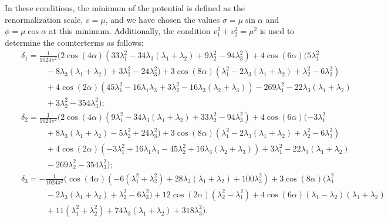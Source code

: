 \documentclass[11pt,a4paper,english,superscriptaddress,preprint,aps,prd]{revtex4}
\begin{document}
\noindent In these conditions, the minimum of the potential is defined as the renormalization scale, $v=\mu$, and we have chosen the values $\sigma=\mu\sin\alpha$ and $\phi=\mu\cos\alpha$ at this minimum. Additionally, the condition $v_1^2+v_2^2=\mu^2$ is used to determine the counterterms as follows:
\begin{subequations}\label{1loop-ct}
\begin{eqnarray}
 &&\delta_1 = \frac{1}{1024 \pi ^2}\Bigr(2 \cos (4 \alpha ) \left(33 \lambda_1^2-34 \lambda_3 (\lambda_1+\lambda_2)+9 \lambda_2^2-94 \lambda_3^2\right)+4 \cos (6 \alpha ) (5 \lambda_1^2\nonumber\\
 &&\qquad\quad-8 \lambda_3 (\lambda_1+\lambda_2)+3 \lambda_2^2-24 \lambda_3^2)+3 \cos (8 \alpha ) \left(\lambda_1^2-2 \lambda_3 (\lambda_1+\lambda_2)+\lambda_2^2-6 \lambda_3^2\right)\nonumber\\
 &&\qquad\quad+4 \cos (2 \alpha ) \left(45 \lambda_1^2-16 \lambda_1 \lambda_3+3 \lambda_2^2-16 \lambda_3 (\lambda_2+\lambda_3)\right)-269 \lambda_1^2-22 \lambda_3 (\lambda_1+\lambda_2)\nonumber\\
 &&\qquad\quad+3 \lambda_2^2-354 \lambda_3^2\Bigr);\\
 &&\delta_2 = \frac{1}{1024 \pi ^2}\Bigr(2 \cos (4 \alpha ) \left(9 \lambda_1^2-34 \lambda_3 (\lambda_1+\lambda_2)+33 \lambda_2^2-94 \lambda_3^2\right)+4 \cos (6 \alpha ) (-3 \lambda_1^2\nonumber\\
 &&\qquad\quad+8 \lambda_3 (\lambda_1+\lambda_2)-5 \lambda_2^2+24 \lambda_3^2)+3 \cos (8 \alpha ) \left(\lambda_1^2-2 \lambda_3 (\lambda_1+\lambda_2)+\lambda_2^2-6 \lambda_3^2\right)\nonumber\\
 &&\qquad\quad+4 \cos (2 \alpha ) \left(-3 \lambda_1^2+16 \lambda_1 \lambda_3-45 \lambda_2^2+16 \lambda_3 (\lambda_2+\lambda_3)\right)+3 \lambda_1^2-22 \lambda_3 (\lambda_1+\lambda_2)\nonumber\\
 &&\qquad\quad-269 \lambda_2^2-354 \lambda_3^2\Bigr);\\
 && \delta_3 = -\frac{1}{1024 \pi ^2}\Bigr(\cos (4 \alpha ) \left(-6 \left(\lambda_1^2+\lambda_2^2\right)+28 \lambda_3 (\lambda_1+\lambda_2)+100 \lambda_3^2\right)+3 \cos (8 \alpha ) (\lambda_1^2\nonumber\\
 &&\qquad\quad-2 \lambda_3 (\lambda_1+\lambda_2)+\lambda_2^2-6 \lambda_3^2)+12 \cos (2 \alpha ) \left(\lambda_2^2-\lambda_1^2\right)+4 \cos (6 \alpha ) (\lambda_1-\lambda_2) (\lambda_1+\lambda_2)\nonumber\\
 &&\qquad\quad+11 \left(\lambda_1^2+\lambda_2^2\right)+74 \lambda_3 (\lambda_1+\lambda_2)+318 \lambda_3^2\Bigr).
\end{eqnarray}
\end{subequations}
\end{document}

